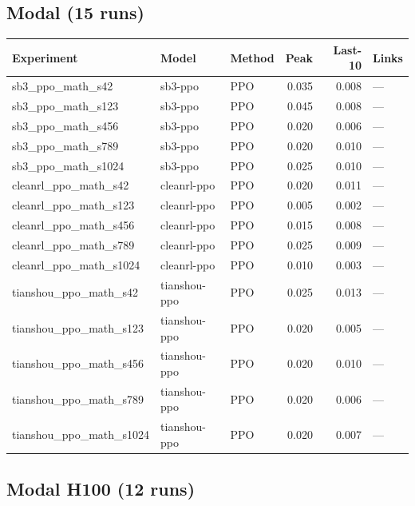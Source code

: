 \documentclass[12pt,a4paper]{report}
\theoremstyle{definition}
\begin{document}
\subsection{Modal (15 runs)}
\label{sec:registry-modal}

{\small
\begin{longtable}{p{3.5cm}p{2cm}p{1.2cm}rrp{3.5cm}}
\toprule
\textbf{Experiment} & \textbf{Model} & \textbf{Method} & \textbf{Peak} & \textbf{Last-10} & \textbf{Links} \\
\midrule
\endhead
sb3\_ppo\_math\_s42 & sb3-ppo & PPO & 0.035 & 0.008 & --- \\
sb3\_ppo\_math\_s123 & sb3-ppo & PPO & 0.045 & 0.008 & --- \\
sb3\_ppo\_math\_s456 & sb3-ppo & PPO & 0.020 & 0.006 & --- \\
sb3\_ppo\_math\_s789 & sb3-ppo & PPO & 0.020 & 0.010 & --- \\
sb3\_ppo\_math\_s1024 & sb3-ppo & PPO & 0.025 & 0.010 & --- \\
cleanrl\_ppo\_math\_s42 & cleanrl-ppo & PPO & 0.020 & 0.011 & --- \\
cleanrl\_ppo\_math\_s123 & cleanrl-ppo & PPO & 0.005 & 0.002 & --- \\
cleanrl\_ppo\_math\_s456 & cleanrl-ppo & PPO & 0.015 & 0.008 & --- \\
cleanrl\_ppo\_math\_s789 & cleanrl-ppo & PPO & 0.025 & 0.009 & --- \\
cleanrl\_ppo\_math\_s1024 & cleanrl-ppo & PPO & 0.010 & 0.003 & --- \\
tianshou\_ppo\_math\_s42 & tianshou-ppo & PPO & 0.025 & 0.013 & --- \\
tianshou\_ppo\_math\_s123 & tianshou-ppo & PPO & 0.020 & 0.005 & --- \\
tianshou\_ppo\_math\_s456 & tianshou-ppo & PPO & 0.020 & 0.010 & --- \\
tianshou\_ppo\_math\_s789 & tianshou-ppo & PPO & 0.020 & 0.006 & --- \\
tianshou\_ppo\_math\_s1024 & tianshou-ppo & PPO & 0.020 & 0.007 & --- \\
\bottomrule
\end{longtable}
}

\subsection{Modal H100 (12 runs)}
\label{sec:registry-modal-h100}
\end{document}
